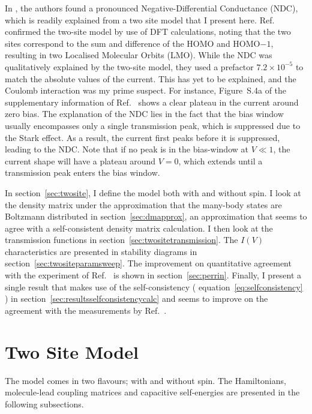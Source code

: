 In \citet{perrinnano}, the authors found a pronounced Negative-Differential Conductance (NDC), which is readily explained from a two site model that I present here. Ref.~\cite{perrinnano} confirmed the two-site model by use of DFT calculations, noting that the two sites correspond to the sum and difference of the HOMO and HOMO$-1$, resulting in two Localised Molecular Orbits (LMO). While the NDC was qualitatively explained by the two-site model, they used a prefactor $7.2 \times 10^{-5}$ to match the absolute values of the current. This has yet to be explained, and the Coulomb interaction was my prime suspect. For instance, Figure~S.4a of the supplementary information of Ref.~\cite{perrinnano} shows a clear plateau in the current around zero bias. The explanation of the NDC lies in the fact that the bias window usually encompasses only a single transmission peak, which is suppressed due to the Stark effect\cite{perrinnano}. As a result, the current first peaks before it is suppressed, leading to the NDC. Note that if no peak is in the bias-window at $V\ll1$, the current shape will have a plateau around $V=0$, which extends until a transmission peak enters the bias window. 

In section~\ref{sec:twosite}, I define the model both with and without spin. I look at the density matrix under the approximation that the many-body states are Boltzmann distributed in section~\ref{sec:dmapprox}, an approximation that seems to agree with a self-consistent density matrix calculation. I then look at the transmission functions in section~\ref{sec:twositetransmission}. The $I(V)$ characteristics  are presented in stability diagrams in section~\ref{sec:twositeparamsweep}. The improvement on quantitative agreement with the experiment of Ref.~\cite{perrinnano} is shown in section~\ref{sec:perrin}. Finally, I present a single result that makes use of the self-consistency ( equation~\ref{eq:selfconsistency} ) in section~\ref{sec:resultsselfconsistencycalc} and seems to improve on the agreement with the measurements by Ref.~\cite{perrinnano}.


\section{Two Site Model} 
The model comes in two flavours; with and without spin. The Hamiltonians, molecule-lead coupling matrices and capacitive self-energies are presented in the following subsections.
\label{sec:twosite}
